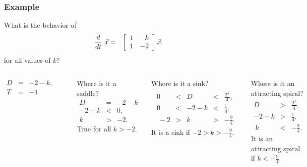 \begin{frame}
  \frametitle{Example}

  What is the behavior of
  \begin{eqnarray*}
    \deriv{~}{t} \vec{x} & = & \arrayTwo{1}{k}{1}{-2} \vec{x}.
  \end{eqnarray*}
  for all values of $k$?

   {
  \begin{columns}
      \begin{eqnarray*}
        D & = & -2-k, \\
        T & = & -1.
      \end{eqnarray*}
      \centerline{\includegraphics[width=3cm]{img/traceDeterminantExample5}}

     { Where is it a saddle?
      \begin{eqnarray*}
        D & = & -2-k \\
        -2-k & < & 0, \\ 
        k & > & -2.
      \end{eqnarray*}
      True for all $k>-2$.  }


     { Where is it a sink?
      \begin{eqnarray*}
        \begin{array}{rcccl}
          0  & < & D    & < & \frac{T^2}{4}, \\
          0  & < & -2-k & < & \frac{1}{4}, \\\
          -2 & > &  k   & > & -\frac{9}{4}.
        \end{array}
      \end{eqnarray*}
      It is a sink if $-2 > k > -\frac{9}{4}$.  }


     { Where is it an attracting spiral?
      \begin{eqnarray*}
        D  & > & \frac{T^2}{4}, \\
        -2-k & > & \frac{1}{4}, \\\
        k  & < & -\frac{9}{4}.
      \end{eqnarray*}
      It is an attracting spiral if $k < -\frac{9}{4}$.  }

  \end{columns}
}


\end{frame}

